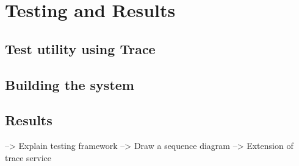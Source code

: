 \chapter{Testing and Results}\label{chap:testing}

\section{Test utility using Trace}
\section{Building the system}
\section{Results}
--> Explain testing framework
--> Draw a sequence diagram
--> Extension of trace service